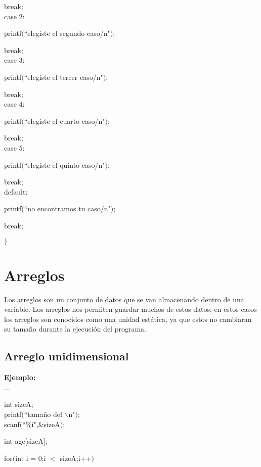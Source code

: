 \documentclass[]{article}
\begin{document}
	break;\\
	
	case 2:
	
	printf$($``elegiste el segundo caso\slash n"$)$;
	
	break;\\
	
	case 3:
	
	printf$($``elegiste el tercer caso\slash n"$)$;
	
	break;\\
	
	case 4:
	
	printf$($``elegiste el cuarto caso\slash n"$)$;
	
	break;\\
	
	case 5:
	
	printf$($``elegiste el quinto caso\slash n"$)$;
	
	break;\\
	
	default:
	
	printf$($``no encontramos tu caso\slash n"$)$;
	
	break;
	
	$\rbrace$
	
	\section{Arreglos}
	Los arreglos son un conjunto de datos que se van almacenando dentro de una variable. Los arreglos nos permiten guardar muchos de estos datos; en estos casos los arreglos son conocidos como una unidad estática, ya que estos no cambiaran su tamaño durante la ejecución del programa.\\
	
	
	\subsection{Arreglo unidimensional}
	
	\textbf{Ejemplo:\\}
	...
	
	int sizeA;\\
	
	printf$($``tamaño del $\backslash$n"$)$;\\
	
	scanf$($``\%i",\&sizeA$)$;
	
	int age$[$sizeA$]$;
	
	for$($int i = 0;i $<$ sizeA;i++$)$
	
\end{document}
